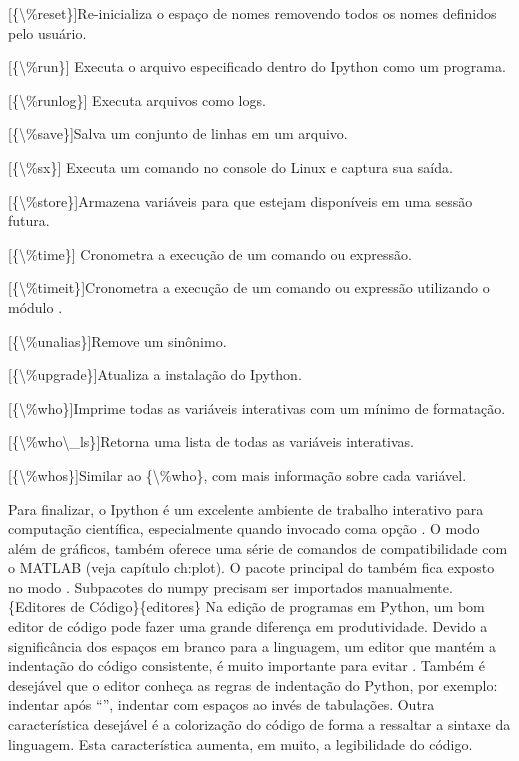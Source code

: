 \documentclass[a4paper,10pt,portuguese]{sphinxmanual}
\begin{document}
\begin{description}
{[}\{\textbackslash{}\%reset\}{]}Re-inicializa o espaço de nomes removendo todos os
nomes definidos pelo usuário.

{[}\{\textbackslash{}\%run\}{]} Executa o arquivo especificado dentro do Ipython como um
programa.

{[}\{\textbackslash{}\%runlog\}{]} Executa arquivos como logs.

{[}\{\textbackslash{}\%save\}{]}Salva um conjunto de linhas em um arquivo.

{[}\{\textbackslash{}\%sx\}{]} Executa um comando no console do Linux e captura sua
saída.

{[}\{\textbackslash{}\%store\}{]}Armazena variáveis para que estejam disponíveis em uma
sessão futura.

{[}\{\textbackslash{}\%time\}{]} Cronometra a execução de um comando ou expressão.

{[}\{\textbackslash{}\%timeit\}{]}Cronometra a execução de um comando ou expressão
utilizando o módulo .

{[}\{\textbackslash{}\%unalias\}{]}Remove um sinônimo.

{[}\{\textbackslash{}\%upgrade\}{]}Atualiza a instalação do Ipython.

{[}\{\textbackslash{}\%who\}{]}Imprime todas as variáveis interativas com um mínimo de
formatação.

{[}\{\textbackslash{}\%who\textbackslash{}\_ls\}{]}Retorna uma lista de todas as variáveis
interativas.

{[}\{\textbackslash{}\%whos\}{]}Similar ao \{\textbackslash{}\%who\}, com mais informação sobre cada
variável.

\end{description}

Para finalizar, o Ipython é um excelente ambiente de trabalho
interativo para computação científica, especialmente quando
invocado coma opção . O modo  além de gráficos,
também oferece uma série de comandos de compatibilidade com o
MATLAB (veja capítulo ch:plot). O pacote principal do 
também fica exposto no modo . Subpacotes do numpy precisam
ser importados manualmente. \{Editores de Código\}\{editores\} Na
edição de programas em Python, um bom editor de código pode fazer
uma grande diferença em produtividade. Devido a significância dos
espaços em branco para a linguagem, um editor que mantém a
indentação do código consistente, é muito importante para evitar
. Também é desejável que o editor conheça as regras de
indentação do Python, por exemplo: indentar após ``\code{:}'', indentar
com espaços ao invés de tabulações. Outra característica desejável
é a colorização do código de forma a ressaltar a sintaxe da
linguagem. Esta característica aumenta, em muito, a legibilidade do
código.
\end{document}
